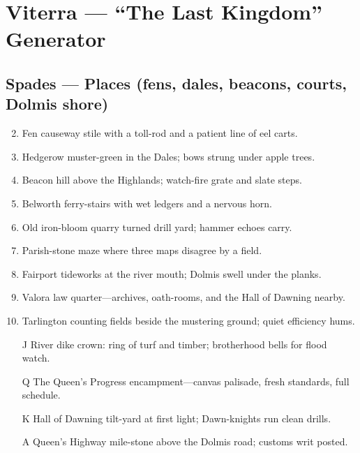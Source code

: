 \chapter{Viterra --- ``The Last Kingdom'' Generator}

\section*{Spades --- Places (fens, dales, beacons, courts, Dolmis shore)}
\begin{enumerate}
\setcounter{enumi}{1}
\item Fen causeway stile with a toll-rod and a patient line of eel carts.
\item Hedgerow muster-green in the Dales; bows strung under apple trees.
\item Beacon hill above the Highlands; watch-fire grate and slate steps.
\item Belworth ferry-stairs with wet ledgers and a nervous horn.
\item Old iron-bloom quarry turned drill yard; hammer echoes carry.
\item Parish-stone maze where three maps disagree by a field.
\item Fairport tideworks at the river mouth; Dolmis swell under the planks.
\item Valora law quarter---archives, oath-rooms, and the Hall of Dawning nearby.
\item Tarlington counting fields beside the mustering ground; quiet efficiency hums.
\item[J] River dike crown: ring of turf and timber; brotherhood bells for flood watch.
\item[Q] The Queen's Progress encampment---canvas palisade, fresh standards, full schedule.
\item[K] Hall of Dawning tilt-yard at first light; Dawn-knights run clean drills.
\item[A] Queen's Highway mile-stone above the Dolmis road; customs writ posted.
\end{enumerate}


